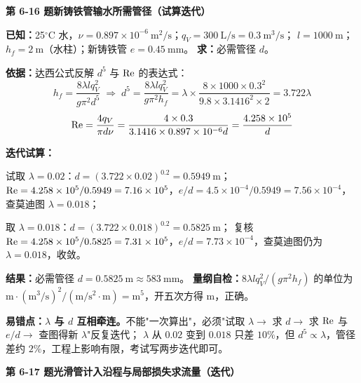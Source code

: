 \noindent\textbf{第 6-16 题\quad 新铸铁管输水所需管径（试算迭代）}

\begin{jie}
\textbf{已知：}25$^\circ$C 水，$\nu=0.897\times10^{-6}\ \mathrm{m^2/s}$；$q_V=300\ \mathrm{L/s}=0.3\ \mathrm{m^3/s}$；
$l=1000\ \mathrm{m}$；$h_f=2\ \mathrm{m}$（水柱）；新铸铁管 $e=0.45\ \mathrm{mm}$。
\textbf{求：}必需管径 $d$。

\textbf{依据：}达西公式反解 $d^5$ 与 $\mathrm{Re}$ 的表达式：
\[ h_f=\frac{8\lambda l q_V^2}{g\pi^2d^5}\;\Longrightarrow\;d^5=\frac{8\lambda lq_V^2}{g\pi^2h_f}
=\lambda\times\frac{8\times1000\times0.3^2}{9.8\times3.1416^2\times2}=3.722\lambda \]
\[ \mathrm{Re}=\frac{4q_V}{\pi d\nu}=\frac{4\times0.3}{3.1416\times0.897\times10^{-6}d}=\frac{4.258\times10^5}{d} \]

\textbf{迭代试算：}
\begin{xiaowen}
\item 试取 $\lambda=0.02$：$d=(3.722\times0.02)^{0.2}=0.5949\ \mathrm{m}$；
$\mathrm{Re}=4.258\times10^5/0.5949=7.16\times10^5$，$e/d=4.5\times10^{-4}/0.5949=7.56\times10^{-4}$，
查莫迪图 $\lambda=0.018$；
\item 取 $\lambda=0.018$：$d=(3.722\times0.018)^{0.2}=0.5825\ \mathrm{m}$；
复核 $\mathrm{Re}=4.258\times10^5/0.5825=7.31\times10^5$，$e/d=7.73\times10^{-4}$，查莫迪图仍为 $\lambda=0.018$，收敛。
\end{xiaowen}

\textbf{结果：}必需管径 $d=0.5825\ \mathrm{m}\approx583\ \mathrm{mm}$。
\textbf{量纲自检：}$8\lambda lq_V^2/(g\pi^2h_f)$ 的单位为
$\mathrm{m\cdot(m^3/s)^2/(m/s^2\cdot m)}=\mathrm{m^5}$，开五次方得 $\mathrm{m}$，正确。
\end{jie}

\begin{yicuo}
\textbf{易错点：$\lambda$ 与 $d$ 互相牵连。}不能"一次算出"，必须"试取 $\lambda\to$ 求 $d\to$ 求 $\mathrm{Re}$ 与 $e/d\to$ 查图得新 $\lambda$"反复迭代；
$\lambda$ 从 $0.02$ 变到 $0.018$ 只差 $10\%$，但 $d^5\propto\lambda$，管径差约 $2\%$，工程上影响有限，考试写两步迭代即可。
\end{yicuo}

\noindent\textbf{第 6-17 题\quad 光滑管计入沿程与局部损失求流量（迭代）}

